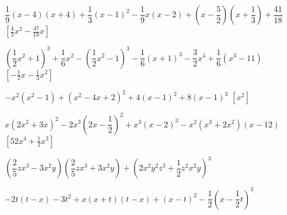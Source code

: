\begin{esercizio}[\Ast]
\begin{enumeratea}
 \item 
$\dfrac{1}{9}(x-4)(x+4)+\dfrac{1}{3}(x-1)^{2}-\dfrac{1}{9}x(x-2)+\left(x-\dfrac{
5}{2}\right)\left(x+\dfrac{1}{3}\right)+\dfrac{41}{18}$
  \hfill $\left[\frac{4}{3}x^{2}-\frac{47}{18}x\right]$
 \item 
$\left(\dfrac{1}{2}x^{2}+1\right)^{3}+\dfrac{1}{6}x^{2}-\left(\dfrac{1}{2}x^{2}
-1\right)^{3}-\dfrac{1}{6}(x+1)^{3}-\dfrac{3}{2}x^{4}+\dfrac{1}{6}
\left(x^3-11\right)$
  \hfill $\left[-{\frac{1}{2}}x-\frac{1}{3}x^{2}\right]$
 \item 
$-x^{2}\left(x^{2}-1\right)+\left(x^{2}-4x+2\right)^{2}+4(x-1)^{2}+8(x-1)^{3}$
  \hfill $\left[x^2\right]$
 \item 
$x\left(2x^{2}+3x\right)^{2}-2x^{3}\left(2x-\dfrac{1}{2}\right)^{2}+x^{3}(x-2)^{
3}-x^{2}\left(x^{3}+2x^{2}\right)(x-12)$
  \hfill $\left[52x^4+\frac{1}{2}x^3\right]$
 \item 
$\left(\dfrac{2}{5}zx^{3}-3x^{2}y\right)\left(\dfrac{2}{5}zx^{3}+3x^{2}
y\right)+\left(2x^{2}y^{2}z^{3}+\dfrac{1}{2}z^{2}x^{2}y\right)^{3}$
 \item 
$-2t(t-x)-3t^{2}+x(x+t)(t-x)+(x-t)^{2}-\dfrac{1}{2}\left(x-\dfrac{1}{2}t\right)^
{3}$
 \end{enumeratea}
\end{esercizio}

